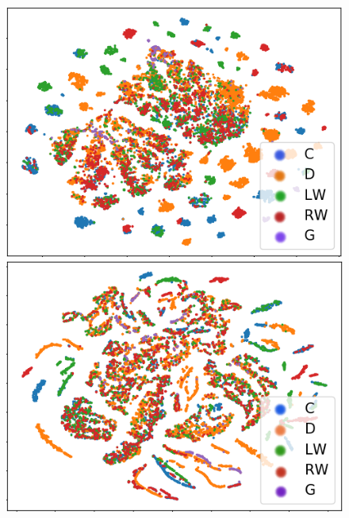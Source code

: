 \documentclass[letterpaper]{article} %
\begin{document}
\begin{figure}[htbp]
    \begin{minipage}[b]{.5\columnwidth}
        \centering
        \includegraphics[width=0.95\columnwidth]{./figures/embedding-visualization-position.png}
    \end{minipage}%
    \begin{minipage}[b]{.5\columnwidth}
        \centering
        \includegraphics[width=0.95\columnwidth]{./figures/embedding-visualization-caernn-position.png}
    \end{minipage}\par\smallskip
    \begin{minipage}[b]{.5\columnwidth}
        \centering

\end{minipage}
\end{figure}
\end{document}
